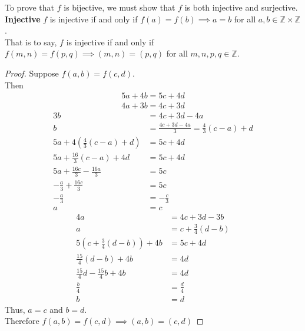 \documentclass{article}
\begin{document}
To prove that \(f\) is bijective, we must show that \(f\) is both injective and surjective. \\

\textbf{Injective} \(f\) is injective if and only if \(f(a) = f(b) \implies a = b\) for all \(a, b \in \mathbb{Z} \times \mathbb{Z}\). \\
That is to say, \(f\) is injective if and only if \(f(m, n) = f(p, q) \implies (m, n) = (p, q)\) for all \(m, n, p, q \in \mathbb{Z}\).
\begin{proof}
    Suppose \(f(a, b) = f(c, d)\). \\
    Then
    \begin{align*}
        5a + 4b = 5c + 4d \\
        4a + 3b = 4c + 3d
    \end{align*}
    \begin{align*}
        3b                                 & = 4c + 3d - 4a                            \\
        b                                  & = \frac{4c+3d-4a}{3} = \frac{4}{3}(c-a)+d \\
        5a + 4(\frac{4}{3}(c-a)+d)         & = 5c + 4d                                 \\
        5a + \frac{16}{3}(c-a) + 4d        & = 5c + 4d                                 \\
        5a + \frac{16c}{3} - \frac{16a}{3} & = 5c                                      \\
        -\frac{a}{3} + \frac{16c}{3}       & = 5c                                      \\
        -\frac{a}{3}                       & = -\frac{c}{3}                            \\
        a                                  & = c
    \end{align*}
    \begin{align*}
        4a                                 & = 4c + 3d - 3b           \\
        a                                  & = c + \frac{3}{4}(d - b) \\
        5(c+\frac{3}{4}(d-b)) + 4b         & = 5c + 4d                \\
        \frac{15}{4}(d-b) + 4b             & = 4d                     \\
        \frac{15}{4}d - \frac{15}{4}b + 4b & = 4d                     \\
        \frac{b}{4}                        & = \frac{d}{4}            \\
        b                                  & = d
    \end{align*}
    Thus, \(a = c\) and \(b = d\). \\
    Therefore \(f(a, b) = f(c, d) \implies (a, b) = (c, d)\)
\end{proof}
\end{document}
